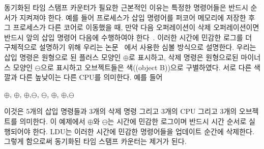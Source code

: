 동기화된 타임 스탬프 카운터가 필요한 근본적인 이유는 특정한 명령어들은 반드시 순서가 
지켜져야 한다.
예를 들어 프로세스가 삽입 명령어를 퍼코어 메모리에 저장한 후 그 프로세스가 다른 코어로 
이동했을 때, 만약 다음 오퍼레이션이 삭제 오퍼레이션이면 반드시 앞의 삽입 명령어 
다음에 수행하여야 한다~\cite{SilasBoydWickizerPth}. 
이러한 시간에 민감한 로그를 더 구체적으로 설명하기 위해 우리는 논문 ~\cite{Clements15SCR}에서 
사용한 심볼 방식으로 설명한다.   
우리는 삽입 명령은 원형으로 된 플러스 모양인 $\oplus$로 표시하고, 삭제 명령은 원형으로된 
마이너스 모양인 $\ominus$으로 표시하고 오브젝트들은 색((object B))으로 구별하였다.
서로 다른 색깔과 다른 높낮이는 다른 CPU를 의미한다. 
예를 들어
\begin{center}
$\oplus$, $\oplus$, $\oplus$,$\ominus$,
$\ominus$, $\oplus$, $\oplus$,$\ominus$
\end{center}
이것은 5개의 삽입 명령들과 3개의 삭제 명령 그리고 3개의 CPU 그리고 3개의 오브젝트를 의미한다.
이 예제에서 $\oplus$와 $\ominus$는 시간에 민감한 로그이며 반드시 시간 순서로
실행되어야 한다.  
LDU는 이러한 시간에 민감한 명령어들을 업데이트 순간에 삭제한다. 그렇게 함으로써 
동기화된 타임 스탬프 카운터는 제거가 된다.
